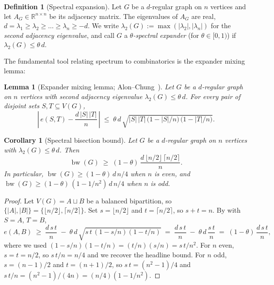 \documentclass[11pt,a4paper]{article}
\newtheorem{lemma}[theorem]{Lemma}
\newtheorem{corollary}[theorem]{Corollary}
\theoremstyle{definition}
\newtheorem{definition}[theorem]{Definition}
\DeclareMathOperator{\bw}{bw}
\newcommand{\RR}{\mathbb{R}}
\begin{document}
\begin{definition}[Spectral expansion]\label{def:spectral}
Let $G$ be a $d$-regular graph on $n$ vertices and let
$A_G \in \RR^{n \times n}$ be its adjacency matrix. The eigenvalues
of $A_G$ are real, $d = \lambda_1 \ge \lambda_2 \ge \dots \ge
\lambda_n \ge -d$. We write $\lambda_2(G) := \max(|\lambda_2|, |\lambda_n|)$
for the \emph{second adjacency eigenvalue}, and call $G$ a
\emph{$\theta$-spectral expander} (for $\theta \in [0, 1)$) if
$\lambda_2(G) \le \theta\,d$.
\end{definition}

The fundamental tool relating spectrum to combinatorics is the
expander mixing lemma:

\begin{lemma}[Expander mixing lemma; Alon--Chung~\cite{AlonChung}]
\label{lem:emix}
Let $G$ be a $d$-regular graph on $n$ vertices with second
adjacency eigenvalue $\lambda_2(G) \le \theta\,d$. For every pair
of disjoint sets $S, T \subseteq V(G)$,
\begin{equation}\label{eq:emix}
   \left|\, e(S, T) - \frac{d\,|S|\,|T|}{n} \,\right|
   \;\le\; \theta\,d\,\sqrt{|S|\,|T|\,\bigl(1 - |S|/n\bigr)\,\bigl(1 - |T|/n\bigr)}.
\end{equation}
\end{lemma}

\begin{corollary}[Spectral bisection bound]\label{cor:bw-spec}
Let $G$ be a $d$-regular graph on $n$ vertices with
$\lambda_2(G) \le \theta\,d$. Then
\[
   \bw(G) \;\ge\; (1 - \theta)\,\frac{d \,\lfloor n/2 \rfloor \,\lceil n/2 \rceil}{n}.
\]
In particular, $\bw(G) \ge (1 - \theta)\,d\,n / 4$ when $n$ is even,
and $\bw(G) \ge (1 - \theta)\,(1 - 1/n^{2})\,d\,n / 4$ when $n$ is odd.
\end{corollary}

\begin{proof}
Let $V(G) = A \sqcup B$ be a balanced bipartition, so
$\{|A|, |B|\} = \{\lfloor n/2 \rfloor, \lceil n/2 \rceil\}$. Set
$s = \lfloor n/2 \rfloor$ and $t = \lceil n/2 \rceil$, so
$s + t = n$. By  with $S = A$, $T = B$,
\[
   e(A, B) \;\ge\; \frac{d\,s\,t}{n}
                 \;-\; \theta\,d\,\sqrt{s\,t\,(1 - s/n)(1 - t/n)}
              \;=\; \frac{d\,s\,t}{n}
                 \;-\; \theta\,d\,\frac{s\,t}{n}
              \;=\; (1 - \theta)\,\frac{d\,s\,t}{n},
\]
where we used $(1 - s/n)(1 - t/n) = (t/n)(s/n) = s\,t / n^{2}$.
For $n$ even, $s = t = n/2$, so $s\,t/n = n/4$ and we recover
the headline bound. For $n$ odd, $s = (n - 1)/2$ and
$t = (n + 1)/2$, so $s\,t = (n^{2} - 1)/4$ and
$s\,t/n = (n^{2} - 1)/(4 n) = (n/4)(1 - 1/n^{2})$.
\end{proof}
\end{document}
